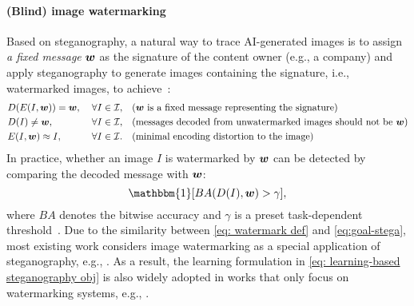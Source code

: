 \paragraph{(Blind) image watermarking}
Based on steganography, a natural way to trace AI-generated images is to assign \emph{a fixed message} $\boldsymbol w$ as the signature of the content owner (e.g., a company) and apply steganography to generate images containing the signature, i.e., watermarked images, to achieve~\citep{jiang2023evading}:
\begin{subequations}
\label{eq: watermark def}
\begin{align}
& D(E(I, \boldsymbol w)) = \boldsymbol w, \; & \forall I \in {\mathcal{I}}, & \quad \text{($\boldsymbol w$ is a fixed message representing the signature)} \\
& D(I) \ne \boldsymbol w, \; & \forall I \in {\mathcal{I}}, & \quad \text{(messages decoded from unwatermarked images should not be $\boldsymbol w$)}  \\
& E(I, \boldsymbol w) \approx I, \; & \forall I \in {\mathcal{I}}.
& \quad \text{(minimal encoding distortion to the image)} 
\end{align}   
\end{subequations}
In practice, whether an image $I$ is watermarked by $\boldsymbol w$ can be detected by comparing the decoded message with $\boldsymbol w$:
\begin{equation}
\label{Eq: detection bar}
    \mathbbm{1} [ BA(D(I), \mb w) > \gamma],
\end{equation} where $BA$ denotes the bitwise accuracy and $\gamma$ is a preset task-dependent threshold~\citep{jiang2023evading,fernandez2023stable,yu2021artificial}.  Due to the similarity between \cref{eq: watermark def} and \cref{eq:goal-stega}, most existing work considers image watermarking as a special application of steganography, e.g., \cite{zhu2018hidden,tancik2020stegastamp,an2024benchmarking,Zhao2024SoKWF}. As a result, the learning formulation in \cref{eq: learning-based steganography obj} is also widely adopted in works that only focus on watermarking systems, e.g., \cite{zhang2019robust,fernandez2023stable}. 
